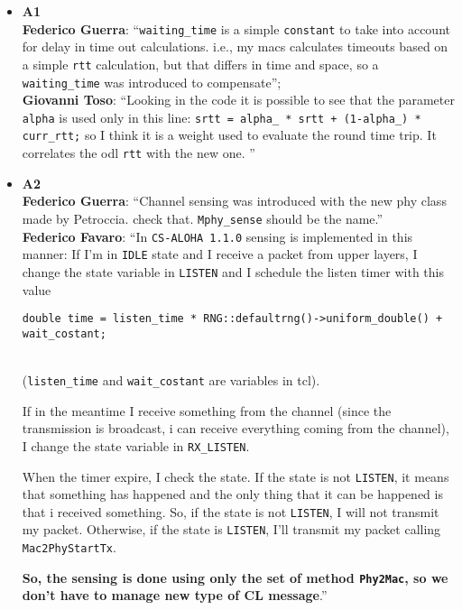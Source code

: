 \documentclass[11pt,journal,draftclsnofoot,onecolumn,twoside,letterpaper]{IEEEtran}
\theoremstyle{definition} \newtheorem{definition}[]{Definition}
\theoremstyle{theorem} \newtheorem{theorem}[]{Theorem}
\begin{document}
\begin{itemize}
 \item {\bf A1}\\
 {\bf Federico Guerra}: ``{\tt waiting\_time} is a simple {\tt constant} to take into account for delay in time out calculations. i.e., my macs calculates timeouts based on a simple {\tt rtt} calculation, but that differs in time and space, so a {\tt waiting\_time} was introduced to compensate'';\\
  {\bf Giovanni Toso}: ``Looking in the code it is possible to see that the parameter {\tt alpha} is used only in this line: {\tt srtt = alpha\_ * srtt + (1-alpha\_) * curr\_rtt;} so I think it is a weight used to evaluate the round time trip. It correlates the odl {\tt rtt} with the new one. ''
 \item {\bf A2}\\
{\bf Federico Guerra}: ``Channel sensing was introduced with the new phy class made by Petroccia. check that. {\tt Mphy\_sense} should be the name.''\\
{\bf Federico Favaro}: ``In {\tt CS-ALOHA 1.1.0} sensing is implemented in this manner: If I'm in {\tt IDLE} state and I receive a packet from upper layers, I change the state variable in {\tt LISTEN} and I schedule the listen timer with this value\\
\begin{small} {\tt double time = listen\_time * RNG::defaultrng()->uniform\_double() + wait\_costant;} \end{small}\\ 
({\tt listen\_time} and {\tt wait\_costant} are variables in tcl).

If in the meantime I receive something from the channel (since the transmission is broadcast, i can receive everything coming from the channel), I change the state variable in {\tt RX\_LISTEN}.

When the timer expire, I check the state. If the state is not {\tt LISTEN}, it means that something has happened and the only thing that it can be happened is that i received something. So, if the state is not {\tt LISTEN}, I will not transmit my packet. Otherwise, if the state is  {\tt LISTEN}, I'll transmit my packet calling {\tt Mac2PhyStartTx}.

{\bf So, the sensing is done using only the set of method {\tt Phy2Mac}, so we don't have to manage new type of CL message}.''


\end{itemize}
\end{document}
